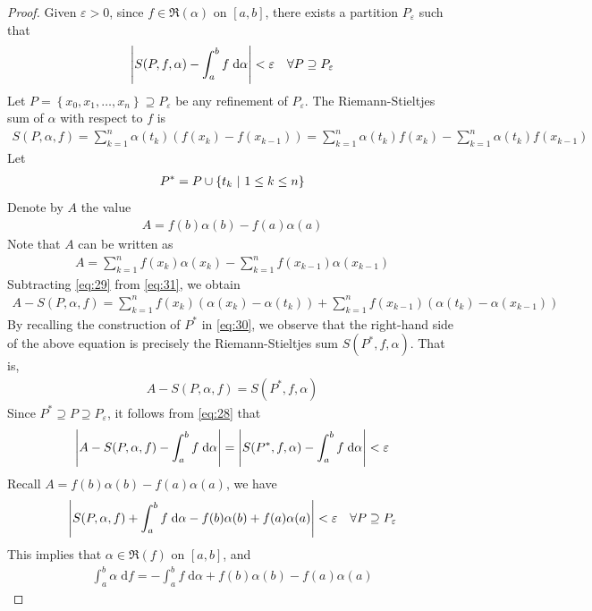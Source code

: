 \documentclass[thmcnt=section, 12pt]{my-elegantbook}
\begin{document}
\begin{proof}
    Given $\varepsilon > 0$, since $f \in \mathfrak{R}(\alpha)$ on $[a, b]$, there exists a partition $P_\varepsilon$ such that
    \begin{align}
        \left\lvert S(P, f, \alpha) - \int_a^b f \; \mathrm{d}\alpha \right\rvert < \varepsilon
        \quad \forall P \supseteq P_\varepsilon
        \label{eq:28}
    \end{align}
    Let $P = \left\{x_0, x_1, \ldots, x_n\right\} \supseteq P_\varepsilon$ be any refinement of $P_\varepsilon$. The Riemann-Stieltjes sum of $\alpha$ with respect to $f$ is
    \begin{align}
        S(P, \alpha, f)
        = \sum_{k=1}^n \alpha(t_k) (f(x_k) - f(x_{k-1}))
        = \sum_{k=1}^n \alpha(t_k) f(x_k)
        - \sum_{k=1}^n \alpha(t_k) f(x_{k-1})
        \label{eq:29}
    \end{align}
    Let
    \begin{align}
        P^\ast = P \cup \left\{ t_k \ \middle| \ 1 \leq k \leq n \right\}
        \label{eq:30}
    \end{align}
    Denote by $A$ the value
    \begin{align*}
        A = f(b)\alpha(b) - f(a)\alpha(a)
    \end{align*}
    Note that $A$ can be written as
    \begin{align}
        A = \sum_{k=1}^n f(x_k) \alpha(x_k)
        - \sum_{k=1}^n f(x_{k-1}) \alpha(x_{k-1})
        \label{eq:31}
    \end{align}
    Subtracting \eqref{eq:29} from \eqref{eq:31}, we obtain
    \begin{align*}
        A - S(P, \alpha, f)
        = \sum_{k=1}^n f(x_k) (\alpha(x_k) - \alpha(t_k))
        + \sum_{k=1}^n f(x_{k-1}) (\alpha(t_k) - \alpha(x_{k-1}))
    \end{align*}
    By recalling the construction of $P^\ast$ in \eqref{eq:30}, we observe that the right-hand side of the above equation is precisely the Riemann-Stieltjes sum $S(P^\ast, f, \alpha)$. That is,
    \begin{align*}
        A - S(P, \alpha, f) = S(P^\ast, f, \alpha)
    \end{align*}
    Since $P^\ast \supseteq P \supseteq P_\varepsilon$, it follows from \eqref{eq:28} that
    \begin{align*}
        \left\lvert A - S(P, \alpha, f) - \int_a^b f \; \mathrm{d}\alpha \right\rvert
        = \left\lvert S(P^\ast, f, \alpha) - \int_a^b f \; \mathrm{d}\alpha \right\rvert
        < \varepsilon
    \end{align*}
    Recall $A = f(b)\alpha(b) - f(a)\alpha(a)$, we have
    \begin{align*}
        \left\lvert S(P, \alpha, f) + \int_a^b f \; \mathrm{d}\alpha - f(b)\alpha(b) + f(a)\alpha(a) \right\rvert < \varepsilon
        \quad \forall P \supseteq P_\varepsilon
    \end{align*}
    This implies that $\alpha \in \mathfrak{R}(f)$ on $[a, b]$, and
    \begin{align*}
        \int_a^b \alpha \;\mathrm{d} f
        = -\int_a^b f \;\mathrm{d}\alpha
        + f(b)\alpha(b) - f(a)\alpha(a)
    \end{align*}
\end{proof}
\end{document}
